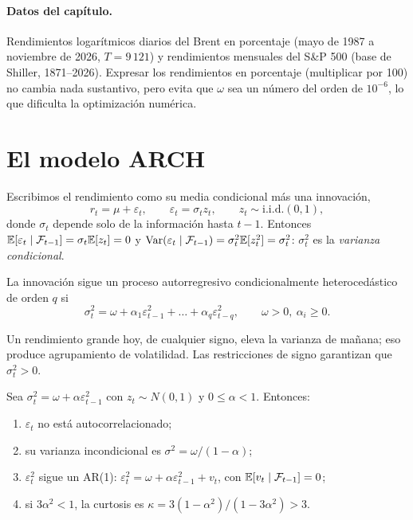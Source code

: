 \paragraph{Datos del capítulo.} Rendimientos logarítmicos diarios del Brent en porcentaje (mayo de 1987 a
noviembre de 2026, $T=9\,121$) y rendimientos mensuales del S\&P 500 (base de Shiller, 1871--2026). Expresar
los rendimientos en porcentaje (multiplicar por 100) no cambia nada sustantivo, pero evita que $\omega$ sea un
número del orden de $10^{-6}$, lo que dificulta la optimización numérica.

\section{El modelo ARCH}

Escribimos el rendimiento como su media condicional más una innovación,
\[
  r_t=\mu+\varepsilon_t,\qquad \varepsilon_t=\sigma_t z_t,\qquad z_t\sim\text{i.i.d.}(0,1),
\]
donde $\sigma_t$ depende solo de la información hasta $t-1$. Entonces
$\mathbb{E}[\varepsilon_t\mid\mathcal F_{t-1}]=\sigma_t\mathbb{E}[z_t]=0$ y
$\operatorname{Var}(\varepsilon_t\mid\mathcal F_{t-1})=\sigma_t^2\mathbb{E}[z_t^2]=\sigma_t^2$: $\sigma_t^2$ es la \emph{varianza
condicional}.

\begin{definicion}
La innovación sigue un proceso autorregresivo condicionalmente heterocedástico de orden $q$ si
\[
  \sigma_t^2=\omega+\alpha_1\varepsilon_{t-1}^2+\dots+\alpha_q\varepsilon_{t-q}^2,
  \qquad \omega>0,\ \alpha_i\ge0 .
\]
\end{definicion}

Un rendimiento grande hoy, de cualquier signo, eleva la varianza de mañana; eso produce agrupamiento de
volatilidad. Las restricciones de signo garantizan que $\sigma_t^2>0$.

\begin{proposicion}\label{prop:arch1}
Sea $\sigma_t^2=\omega+\alpha\varepsilon_{t-1}^2$ con $z_t\sim N(0,1)$ y $0\le\alpha<1$. Entonces:
\begin{enumerate}[label=(\roman*)]
  \item $\varepsilon_t$ no está autocorrelacionado;
  \item su varianza incondicional es $\sigma^2=\omega/(1-\alpha)$;
  \item $\varepsilon_t^2$ sigue un AR(1): $\varepsilon_t^2=\omega+\alpha\varepsilon_{t-1}^2+v_t$, con
        $\mathbb{E}[v_t\mid\mathcal F_{t-1}]=0$;
  \item si $3\alpha^2<1$, la curtosis es $\kappa=3(1-\alpha^2)/(1-3\alpha^2)>3$.
\end{enumerate}
\end{proposicion}


